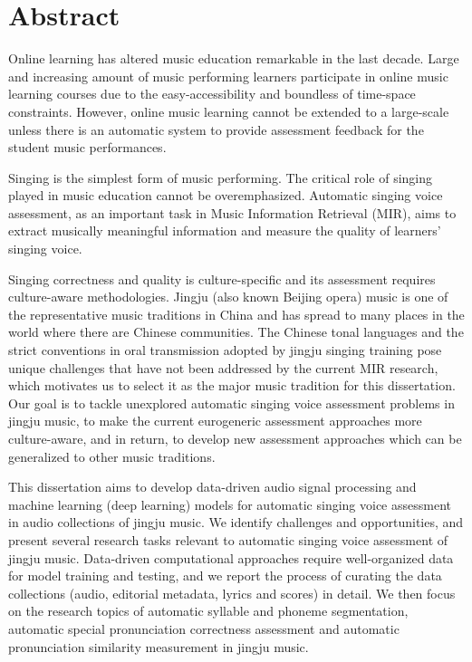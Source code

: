 \chapter{Abstract}
\vspace*{-1cm}
Online learning has altered music education remarkable in the last decade. Large and increasing amount of music performing learners participate in online music learning courses due to the easy-accessibility and boundless of time-space constraints. However, online music learning cannot be extended to a large-scale unless there is an automatic system to provide assessment feedback for the student music performances.

Singing is the simplest form of music performing. The critical role of singing played in music education cannot be overemphasized. Automatic singing voice assessment, as an important task in Music Information Retrieval (MIR), aims to extract musically meaningful information and measure the quality of learners' singing voice.

Singing correctness and quality is culture-specific and its assessment requires culture-aware methodologies. Jingju (also known Beijing opera) music is one of the representative music traditions in China and has spread to many places in the world where there are Chinese communities. The Chinese tonal languages and the strict conventions in oral transmission adopted by jingju singing training pose unique challenges that have not been addressed by the current MIR research, which motivates us to select it as the major music tradition for this dissertation. Our goal is to tackle unexplored automatic singing voice assessment problems in jingju music, to make the current eurogeneric assessment approaches more culture-aware, and in return, to develop new assessment approaches which can be generalized to other music traditions.

This dissertation aims to develop data-driven audio signal processing and machine learning (deep learning) models for automatic singing voice assessment in audio collections of jingju music. We identify challenges and opportunities, and present several research tasks relevant to automatic singing voice assessment of jingju music. Data-driven computational approaches require well-organized data for model training and testing, and we report the process of curating the data collections (audio, editorial metadata, lyrics and scores) in detail. We then focus on the research topics of automatic syllable and phoneme segmentation, automatic special pronunciation correctness assessment and automatic pronunciation similarity measurement in jingju music.


